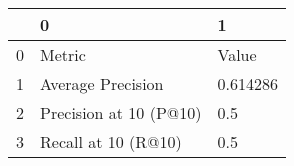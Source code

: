 \begin{tabular}{lll}
\toprule
{} &                       0 &         1 \\
\midrule
0 &                  Metric &     Value \\
1 &       Average Precision &  0.614286 \\
2 &  Precision at 10 (P@10) &       0.5 \\
3 &     Recall at 10 (R@10) &       0.5 \\
\bottomrule
\end{tabular}
